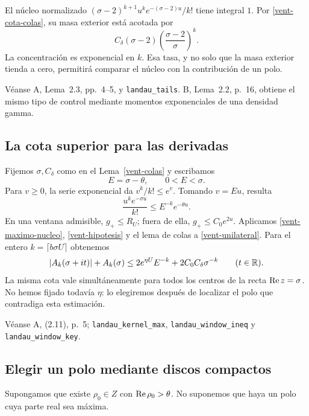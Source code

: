 El núcleo normalizado
$(\sigma-2)^{k+1}u^ke^{-(\sigma-2)u}/k!$ tiene integral $1$.
Por \eqref{vent-cota-colas}, su masa exterior está acotada por
\[
 C_\delta(\sigma-2)
 \left(\frac{\sigma-2}{\sigma}\right)^k.
\]
La concentración es exponencial en $k$. Esa tasa, y no solo que la masa
exterior tienda a cero, permitirá comparar el núcleo con la contribución
de un polo.

{\raggedright
Véanse A, Lema~2.3, pp.~4--5, y \texttt{landau\_tails}.
B, Lema~2.2, p.~16, obtiene el mismo tipo de control mediante momentos
exponenciales de una densidad gamma.
\par}

\subsection{La cota superior para las derivadas}

Fijemos $\sigma,C_\delta$ como en el Lema~\ref{vent-colas}
y escribamos
\[
 E=\sigma-\theta,\qquad 0<E<\sigma.
\]
Para $v\ge0$, la serie exponencial da $v^k/k!\le e^v$.
Tomando $v=Eu$, resulta
\begin{equation}
 \frac{u^ke^{-\sigma u}}{k!}\le E^{-k}e^{-\theta u}.
 \label{vent-maximo-nucleo}
\end{equation}
En una ventana admisible, $g_+\le R_U$; fuera de ella,
$g_+\le C_0e^{2u}$. Aplicamos \eqref{vent-maximo-nucleo},
\eqref{vent-hipotesis} y el lema de colas a \eqref{vent-unilateral}.
Para el entero $k=\lceil b\sigma U\rceil$ obtenemos
\begin{equation}
 |A_k(\sigma+it)|+A_k(\sigma)
 \le 2e^{\eta U}E^{-k}+2C_0C_\delta\sigma^{-k}
 \qquad(t\in\mathbb{R}).
 \label{vent-cota-superior}
\end{equation}
La misma cota vale simultáneamente para todos los centros de la recta
$\operatorname{Re} z=\sigma$. No hemos fijado todavía $\eta$: lo elegiremos después
de localizar el polo que contradiga esta estimación.

{\raggedright
Véanse A, (2.11), p.~5; \texttt{landau\_kernel\_max},
\texttt{landau\_window\_ineq} y \texttt{landau\_window\_key}.
\par}

\subsection{Elegir un polo mediante discos compactos}

Supongamos que existe $\rho_0\in Z$ con $\operatorname{Re}\rho_0>\theta$.
No suponemos que haya un polo cuya parte real sea máxima.

